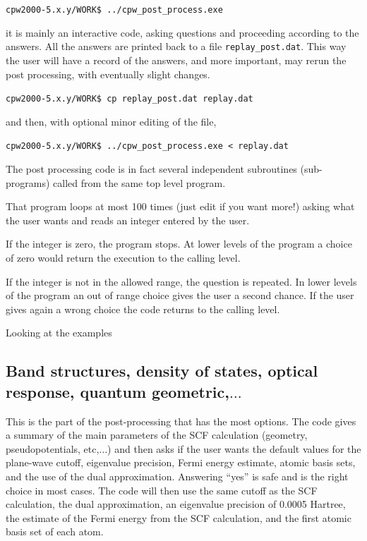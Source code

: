 \documentclass[11pt]{article}
\begin{document}
\noindent\texttt{cpw2000-5.x.y/WORK\$  ../cpw\_post\_process.exe}

it is mainly an interactive code, asking questions and proceeding according to the answers.
All the answers are printed back to a file \texttt{replay\_post.dat}.
This way the user will have a record of the answers, and more important,
may rerun the post processing, with eventually slight changes.

\noindent\texttt{cpw2000-5.x.y/WORK\$  cp replay\_post.dat replay.dat}

and then, with optional minor editing of the file,

\noindent\texttt{cpw2000-5.x.y/WORK\$  ../cpw\_post\_process.exe < replay.dat}

The post processing code is in fact several independent subroutines (sub-programs) called from the
same top level program.

That program loops at most 100 times (just edit if you want more!)
asking what the user wants and reads an integer entered by the user.

If the integer is zero, the program stops.  At lower levels of the program a choice of
zero would return the execution to the calling level.

If the integer is not in the allowed range, the question is repeated.
In lower levels of the program an out of range choice gives the user a second chance.
If the user gives again a wrong choice the code returns to the calling level.

Looking at the examples


\subsection{Band structures, density of states, optical response, quantum geometric,$\ldots$}

This is the part of the post-processing that has the most options.
The code gives a summary of the main parameters of the SCF calculation (geometry, pseudopotentials, etc,$\ldots$)
and then asks if the user wants the default values for the plane-wave cutoff, eigenvalue precision,
Fermi energy estimate, atomic basis sets, and the use of the dual approximation.
Answering ``yes'' is safe and is the right choice in most cases.
The code will then use the same cutoff as the SCF calculation, the dual approximation,
an eigenvalue precision of 0.0005 Hartree, the estimate of the Fermi energy
from the SCF calculation, and the first atomic basis set of each atom.
\end{document}
